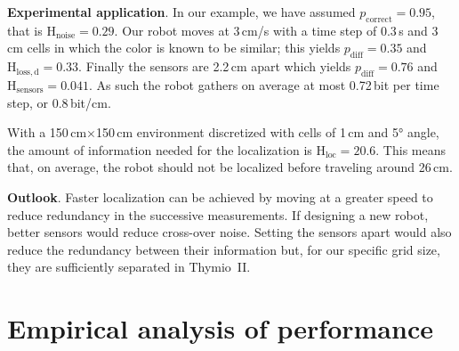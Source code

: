 \documentclass{svmult}
\newcommand{\ent}[1]{\mathrm{H}_\mathrm{#1}} %
\begin{document}
\textbf{Experimental application}. In our example, we have assumed $p_\mathrm{correct}=0.95$, that is $\ent{noise}=0.29$.
Our robot moves at 3\,cm/s with a time step of 0.3\,s and 3\,cm cells in which the color is known to be similar; this yields $p_\mathrm{diff}=0.35$ and $\ent{loss,d}=0.33$.
Finally the sensors are 2.2\,cm apart which yields $p_\mathrm{diff}=0.76$ and $\ent{sensors}=0.041$.
As such the robot gathers on average at most 0.72\,bit per time step, or 0.8\,bit/cm.

With a 150\,cm$\times$150\,cm environment discretized with cells of 1\,cm and 5° angle, the amount of information needed for the localization is $\ent{loc}=20.6$.
This means that, on average, the robot should not be localized before traveling around 26\,cm.

\textbf{Outlook}. Faster localization can be achieved by moving at a greater speed to reduce redundancy in the successive measurements.
If designing a new robot, better sensors would reduce cross-over noise.
Setting the sensors apart would also reduce the redundancy between their information but, for our specific grid size, they are sufficiently separated in Thymio~II.

\section{Empirical analysis of performance}

\end{document}
